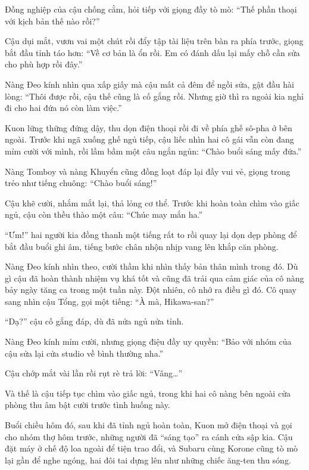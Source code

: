 \documentclass[../main.tex]{subfiles}
\begin{document}
Đồng nghiệp của cậu chống cằm, hỏi tiếp với giọng đầy tò mò: ``Thế phần thoại với kịch bản thế nào rồi?''

Cậu dụi mắt, vươn vai một chút rồi đẩy tập tài liệu trên bàn ra phía trước, giọng bắt đầu tỉnh táo hơn: ``Về cơ bản là ổn rồi. Em có đánh dấu lại mấy chỗ cần sửa cho phù hợp rồi đây.''

Nàng Đeo kính nhìn qua xấp giấy mà cậu mất cả đêm để ngồi sửa, gật đầu hài lòng: ``Thôi được rồi, cậu thế cũng là cố gắng rồi. Nhưng giờ thì ra ngoài kia nghỉ đi cho hai đứa nó còn làm việc.''

Kuon lững thững đứng dậy, thu dọn điện thoại rồi đi về phía ghế sô-pha ở bên ngoài. Trước khi ngã xuống ghế ngủ tiếp, cậu liếc nhìn hai cô gái vẫn còn đang mỉm cười với mình, rồi lầm bầm một câu ngắn ngủn: ``Chào buổi sáng mấy đứa.''

Nàng Tomboy và nàng Khuyển cũng đồng loạt đáp lại đầy vui vẻ, giọng trong trẻo như tiếng chuông: ``Chào buổi sáng!''

Cậu khẽ cười, nhắm mắt lại, thả lỏng cơ thể. Trước khi hoàn toàn chìm vào giấc ngủ, cậu còn thều thào một câu: ``Chúc may mắn ha.''

``Ưm!'' hai người kia đồng thanh một tiếng rất to rồi quay lại dọn dẹp phòng để bắt đầu buổi ghi âm, tiếng bước chân nhộn nhịp vang lên khắp căn phòng.

Nàng Đeo kính nhìn theo, cười thầm khi nhìn thấy bản thân mình trong đó. Dù gì cậu đã hoàn thành nhiệm vụ khá tốt và cũng đã trải qua cảm giác của cô nàng bảy ngày tăng ca trong một tuần này. Đột nhiên, cô nhớ ra điều gì đó. Cô quay sang nhìn cậu Tổng, gọi một tiếng: ``À mà, Hikawa-san?''

``Dạ?'' cậu cố gắng đáp, dù đã nửa ngủ nửa tỉnh.

Nàng Đeo kính mỉm cười, nhưng giọng điệu đầy uy quyền: ``Bảo với nhóm của cậu sửa lại cửa studio về bình thường nha.''

Cậu chớp mắt vài lần rồi rụt rè trả lời: ``Vâng\dots''

Và thế là cậu tiếp tục chìm vào giấc ngủ, trong khi hai cô nàng bên ngoài cửa phòng thu âm bật cười trước tình huống này.

\ct

Buổi chiều hôm đó, sau khi đã tỉnh ngủ hoàn toàn, Kuon mở điện thoại và gọi cho nhóm thợ hôm trước, những người đã ``sáng tạo'' ra cánh cửa sập kia. Cậu đặt máy ở chế độ loa ngoài để tiện trao đổi, và Subaru cùng Korone cũng tò mò lại gần để nghe ngóng, hai đôi tai dựng lên như những chiếc ăng-ten thu sóng.
\end{document}
